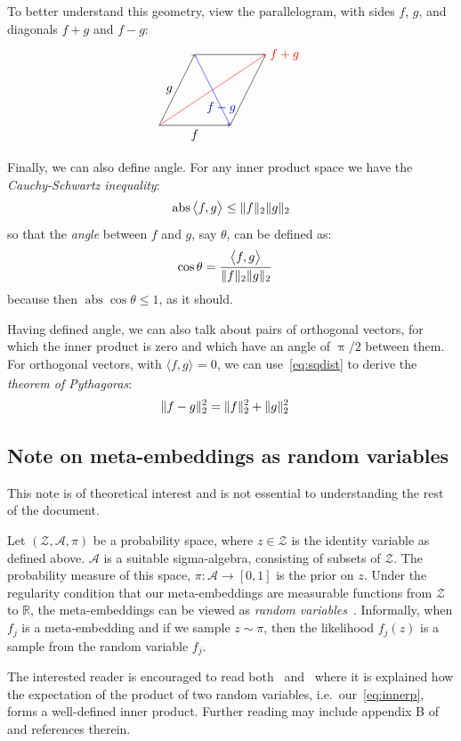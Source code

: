 \documentclass[a4paper,oneside,12pt,english]{report}
\DeclareMathOperator{\abs}{abs}
\def\expv#1#2{\bigl\langle#1\bigr\rangle_{#2}}
\def\R{\mathbb{R}}
\def\Zset{\mathcal{Z}}
\def\Zset{\mathcal{Z}}
\def\dot#1#2{\expv{#1,#2}{}}
\begin{document}
To better understand this geometry, view the parallelogram, with sides $f$, $g$, and diagonals $f+g$ and $f-g$: 
$$
\begin{tikzpicture}[xscale=1,yscale=1]
\draw[->] (0,0) -- node[left]{$g$} (1,2);  %
\draw (1,2) -- (3,2) -- (2,0);
\draw[->] (0,0) -- node[below]{$f$} (2,0); %
\draw[->,red] (0,0) --  (3,2) node[right]{$f+g$}; %
\draw[->,blue] (1,2) --node[near end] {$f-g$} (2,0); %
\end{tikzpicture}
$$
Finally, we can also define angle. For any inner product space we have the \emph{Cauchy-Schwartz inequality}:
\begin{align}
\label{eq:CSI}
\abs{\dot{f}{g}} \le \norm{f}\norm{g}
\end{align}	
so that the \emph{angle} between $f$ and $g$, say $\theta$, can be defined as:
\begin{align}
\cos\theta &= \frac{\dot{f}{g}}{\norm{f}\norm{g}}
\end{align}	
because then $\abs{\cos\theta}\le1$, as it should. 

Having defined angle, we can also talk about pairs of orthogonal vectors, for which the inner product is zero and which have an angle of $\uppi/2$ between them. For orthogonal vectors, with $\dot{f}{g}=0$, we can use~\eqref{eq:sqdist} to derive the \emph{theorem of Pythagoras}:
\begin{align}
\label{eq:Pythagoras}
\lVert f-g\rVert_2^2 &= \lVert f\rVert_2^2 +\lVert g\rVert_2^2 
\end{align} 


\subsection{Note on meta-embeddings as random variables}
\def\Aset{\mathcal{A}}
This note is of theoretical interest and is not essential to understanding the rest of the document. 

Let $(\Zset,\Aset,\pi)$ be a probability space, where $z\in\Zset$ is the identity variable as defined above. $\Aset$ is a suitable sigma-algebra, consisting of subsets of $\Zset$. The probability measure of this space, $\pi:\Aset\to[0,1]$ is the prior on $z$. Under the regularity condition that our meta-embeddings are measurable functions from $\Zset$ to $\R$, the meta-embeddings can be viewed as \emph{random variables}~\cite{Billingsley}. Informally, when $f_j$ is a meta-embedding and if we sample $z\sim\pi$, then the likelihood $f_j(z)$ is a sample from the random variable $f_j$. 

The interested reader is encouraged to read both~\cite{random} and~\cite{ouwehand} where it is explained how the expectation of the product of two random variables, i.e.\ our~\eqref{eq:innerp}, forms a well-defined inner product. Further reading may include appendix B of~\cite{Bigoni} and references therein.
\end{document}
